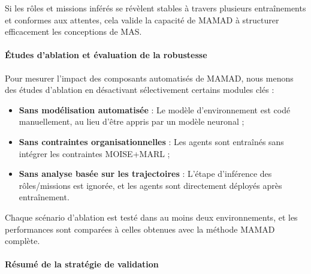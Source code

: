 Si les rôles et missions inférés se révèlent stables à travers plusieurs entraînements et conformes aux attentes, cela valide la capacité de MAMAD à structurer efficacement les conceptions de MAS.

\paragraph{Études d'ablation et évaluation de la robustesse}

Pour mesurer l'impact des composants automatisés de MAMAD, nous menons des études d'ablation en désactivant sélectivement certains modules clés :

\begin{itemize}
    \item \textbf{Sans modélisation automatisée} : Le modèle d'environnement est codé manuellement, au lieu d'être appris par un modèle neuronal ;
    \item \textbf{Sans contraintes organisationnelles} : Les agents sont entraînés sans intégrer les contraintes MOISE+MARL ;
    \item \textbf{Sans analyse basée sur les trajectoires} : L'étape d'inférence des rôles/missions est ignorée, et les agents sont directement déployés après entraînement.
\end{itemize}

Chaque scénario d'ablation est testé dans au moins deux environnements, et les performances sont comparées à celles obtenues avec la méthode MAMAD complète.

\paragraph{Résumé de la stratégie de validation}

